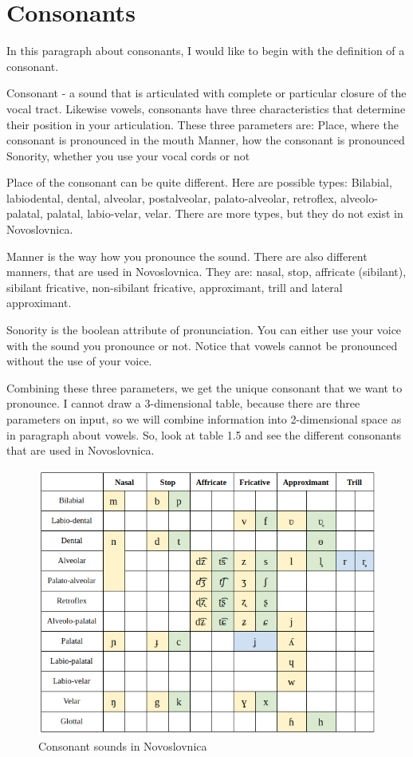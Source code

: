 \section{Consonants}

In this paragraph about consonants, I would like to begin with the definition of a consonant.

Consonant - a sound that is articulated with complete or particular closure of the vocal tract. 
Likewise vowels, consonants have three characteristics that determine their position in your articulation. These three parameters are:
Place, where the consonant is pronounced in the mouth
Manner, how the consonant is pronounced 
Sonority, whether you use your vocal cords or not

Place of the consonant can be quite different. Here are possible types: Bilabial, labiodental, dental, alveolar, postalveolar, palato-alveolar, retroflex, alveolo-palatal, palatal, labio-velar, velar. There are more types, but they do not exist in Novoslovnica.

Manner is the way how you pronounce the sound. There are also different manners, that are used in Novoslovnica. They are: nasal, stop, affricate (sibilant), sibilant fricative, non-sibilant fricative, approximant, trill and lateral approximant.

Sonority is the boolean attribute of pronunciation. You can either use your voice with the sound you pronounce or not. Notice that vowels cannot be pronounced without the use of your voice. 

Combining these three parameters, we get the unique consonant that we want to pronounce. I cannot draw  a 3-dimensional table, because there are three parameters on input, so we will combine information into 2-dimensional space as in paragraph about vowels. So, look at table 1.5 and see the different consonants that are used in Novoslovnica.

\begin{figure}
	\includegraphics[width=\linewidth]{./sources/consonants.png}
	\caption{Consonant sounds in Novoslovnica}
	\label{fig:consonants}
\end{figure}

